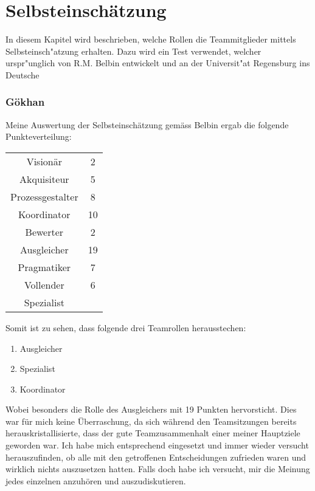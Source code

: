 
\chapter{Selbsteinschätzung}

In diesem Kapitel wird beschrieben, welche Rollen die Teammitglieder mittels Selbsteinsch"atzung erhalten. Dazu wird ein Test verwendet, welcher urspr"unglich von R.M. Belbin \cite{belbin1981management} entwickelt und an der Universit"at Regensburg ins Deutsche %

\subsection*{Gökhan}

Meine Auswertung der Selbsteinschätzung gemäss Belbin ergab die folgende Punkteverteilung:

\begin{tabular}{cc}
  Visionär & 2 \\ 
  Akquisiteur & 5 \\ 
  Prozessgestalter & 8 \\ 
  Koordinator & 10 \\ 
  Bewerter & 2 \\
  Ausgleicher & 19 \\
  Pragmatiker & 7 \\
  Vollender & 6 \\
  Spezialist & \\
\end{tabular}
\newline


Somit ist zu sehen, dass folgende drei Teamrollen herausstechen: \\
\begin{enumerate} 
\item Ausgleicher 
\item Spezialist
\item Koordinator
\end{enumerate}

Wobei besonders die Rolle des Ausgleichers mit 19 Punkten hervorsticht. Dies war für mich keine Überraschung, da sich während den Teamsitzungen bereits herauskristallisierte, dass der gute Teamzusammenhalt einer meiner Hauptziele geworden war. Ich habe mich entsprechend eingesetzt und immer wieder versucht herauszufinden, ob alle mit den getroffenen Entscheidungen zufrieden waren und wirklich nichts auszusetzen hatten. Falls doch habe ich versucht, mir die Meinung jedes einzelnen anzuhören und auszudiskutieren. 

